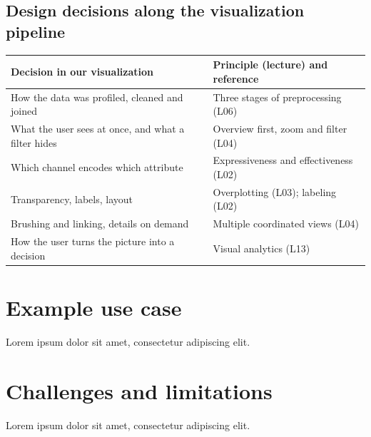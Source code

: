 \documentclass{aureport}
\begin{document}
\subsection{Design decisions along the visualization pipeline}\label{sec:principles}
\begin{table}[h]
  \footnotesize
  \begin{tabularx}{\linewidth}{@{}Y Y@{}}
    \toprule
    \textbf{Decision in our visualization} & \textbf{Principle (lecture) and reference} \\
    \midrule
    How the data was profiled, cleaned and joined & Three stages of preprocessing (L06) \\
    What the user sees at once, and what a filter hides & Overview first, zoom and filter (L04) \parencite{shneiderman1996} \\
    Which channel encodes which attribute & Expressiveness and effectiveness (L02) \\
    Transparency, labels, layout & Overplotting (L03); labeling (L02) \\
    Brushing and linking, details on demand & Multiple coordinated views (L04) \\
    How the user turns the picture into a decision & Visual analytics (L13) \\
    \bottomrule
  \end{tabularx}
\end{table}

\section{Example use case}
Lorem ipsum dolor sit amet, consectetur adipiscing elit.

\section{Challenges and limitations}
Lorem ipsum dolor sit amet, consectetur adipiscing elit.
\end{document}
